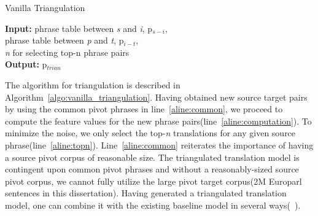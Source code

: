 \begin{algorithm}
\caption{Vanilla Triangulation}
\label{algo:vanilla_triangulation}

\textbf{Input:} phrase table between \emph{s} and \emph{i}, p$_{s-i}$, \\
 phrase table between \emph{p} and \emph{t}, p$_{i-t}$,  \\
 \emph{n} for selecting top-n phrase pairs \\
\textbf{Output:} p$_{trian}$
\begin{algorithmic}[l]
 \label{aline:common}

         \label{aline:computation}
        \ENDFOR
         \label{aline:topn}
        \ENDIF
        \ENDFOR


\end{algorithmic}

\end{algorithm}

The algorithm for triangulation is described in Algorithm~\ref{algo:vanilla_triangulation}. Having obtained new source target pairs by using the common pivot phrases in line~\ref{aline:common}, we proceed to compute the feature values for the new phrase pairs(line~\ref{aline:computation}). To minimize the noise, we only select the top-\emph{n} translations for any given source phrase(line~\ref{aline:topn}). Line~\ref{aline:common} reiterates the importance of having a source pivot corpus of reasonable size. The triangulated translation model is contingent upon common pivot phrases and without a reasonably-sized source pivot corpus, we cannot fully utilize the large pivot target corpus(2M Europarl sentences in this dissertation). Having generated a triangulated translation model, one can combine it with the existing baseline model in several ways(~\cite{Bertoldi:08, Nakov:12, Cohn:07}). 

